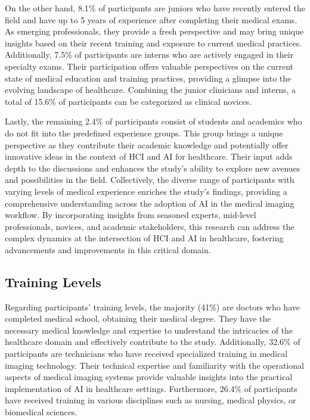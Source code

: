 On the other hand, 8.1\% of participants are juniors who have recently entered the field and have up to 5 years of experience after completing their medical exams.
As emerging professionals, they provide a fresh perspective and may bring unique insights based on their recent training and exposure to current medical practices.
Additionally, 7.5\% of participants are interns who are actively engaged in their specialty exams.
Their participation offers valuable perspectives on the current state of medical education and training practices, providing a glimpse into the evolving landscape of healthcare.
Combining the junior clinicians and interns, a total of 15.6\% of participants can be categorized as clinical novices.

Lastly, the remaining 2.4\% of participants consist of students and academics who do not fit into the predefined experience groups.
This group brings a unique perspective as they contribute their academic knowledge and potentially offer innovative ideas in the context of \ac{HCI} and \ac{AI} for healthcare.
Their input adds depth to the discussions and enhances the study's ability to explore new avenues and possibilities in the field.
Collectively, the diverse range of participants with varying levels of medical experience enriches the study's findings, providing a comprehensive understanding across the adoption of \ac{AI} in the medical imaging workflow.
By incorporating insights from seasoned experts, mid-level professionals, novices, and academic stakeholders, this research can address the complex dynamics at the intersection of \ac{HCI} and \ac{AI} in healthcare, fostering advancements and improvements in this critical domain.

\subsection{Training Levels}
\label{chap:app003003002}

Regarding participants' training levels, the majority (41\%) are doctors who have completed medical school, obtaining their medical degree.
They have the necessary medical knowledge and expertise to understand the intricacies of the healthcare domain and effectively contribute to the study.
Additionally, 32.6\% of participants are technicians who have received specialized training in medical imaging technology.
Their technical expertise and familiarity with the operational aspects of medical imaging systems provide valuable insights into the practical implementation of \ac{AI} in healthcare settings.
Furthermore, 26.4\% of participants have received training in various disciplines such as nursing, medical physics, or biomedical sciences.

